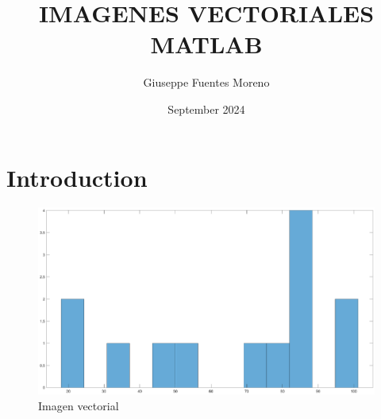 \documentclass{article}
\title{IMAGENES VECTORIALES MATLAB}
\author{Giuseppe Fuentes Moreno}
\date{September 2024}
\begin{document}
\maketitle

\section{Introduction}

\begin{figure}
\begin{center}
    \centering
    \includegraphics[width=1\linewidth]{untitled.eps}
    \caption{Imagen vectorial}
    \label{fig_vectorial}
\end{center}
\end{figure}
\end{document}
